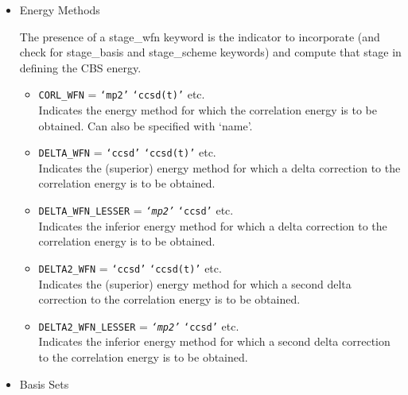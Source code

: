 \begin{itemize}
\item Energy Methods

The presence of a stage\_wfn keyword is the indicator to incorporate (and check for 
stage\_basis and stage\_scheme keywords) and compute that stage in defining the CBS energy.
\begin{itemize}
\item[] \texttt{CORL\_WFN} = \texttt{`mp2'} \textbar\; \texttt{`ccsd(t)'} \textbar\; etc. \\
Indicates the energy method for which the correlation energy is to be obtained. Can also be specified with `name'.
\item[] \texttt{DELTA\_WFN} = \texttt{`ccsd'} \textbar\; \texttt{`ccsd(t)'} \textbar\; etc. \\
Indicates the (superior) energy method for which a delta correction to the correlation energy is to be obtained.
\item[] \texttt{DELTA\_WFN\_LESSER} = \texttt{\textit{`mp2'}} \textbar\; \texttt{`ccsd'} \textbar\; etc. \\
Indicates the inferior energy method for which a delta correction to the correlation energy is to be obtained.
\item[] \texttt{DELTA2\_WFN} = \texttt{`ccsd'} \textbar\; \texttt{`ccsd(t)'} \textbar\; etc. \\
Indicates the (superior) energy method for which a second delta correction to the correlation energy is to be obtained.
\item[] \texttt{DELTA2\_WFN\_LESSER} = \texttt{\textit{`mp2'}} \textbar\; \texttt{`ccsd'} \textbar\; etc. \\
Indicates the inferior energy method for which a second delta correction to the correlation energy is to be obtained.
\end{itemize}

\item Basis Sets


\end{itemize}
